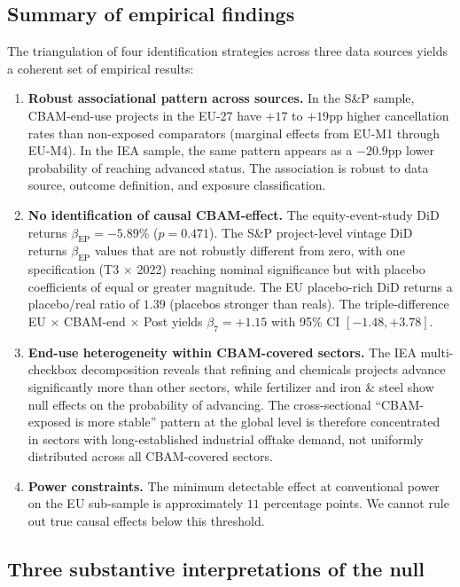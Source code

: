 \documentclass[11pt,a4paper]{article}
\newcommand{\bep}{\beta_{\mathrm{EP}}}
\begin{document}
\subsection{Summary of empirical findings}

The triangulation of four identification strategies across three data sources yields a coherent set of empirical results:

\begin{enumerate}
\item \textbf{Robust associational pattern across sources.} In the S\&P sample, CBAM-end-use projects in the EU-27 have $+17$ to $+19$pp higher cancellation rates than non-exposed comparators (marginal effects from EU-M1 through EU-M4). In the IEA sample, the same pattern appears as a $-20.9$pp lower probability of reaching advanced status. The association is robust to data source, outcome definition, and exposure classification.

\item \textbf{No identification of causal CBAM-effect.} The equity-event-study DiD returns $\bep = -5.89\%$ ($p = 0.471$). The S\&P project-level vintage DiD returns $\bep$ values that are not robustly different from zero, with one specification (T3 $\times$ 2022) reaching nominal significance but with placebo coefficients of equal or greater magnitude. The EU placebo-rich DiD returns a placebo/real ratio of $1.39$ (placebos stronger than reals). The triple-difference EU $\times$ CBAM-end $\times$ Post yields $\beta_7 = +1.15$ with 95\% CI $[-1.48, +3.78]$.

\item \textbf{End-use heterogeneity within CBAM-covered sectors.} The IEA multi-checkbox decomposition reveals that refining and chemicals projects advance significantly more than other sectors, while fertilizer and iron \& steel show null effects on the probability of advancing. The cross-sectional ``CBAM-exposed is more stable'' pattern at the global level is therefore concentrated in sectors with long-established industrial offtake demand, not uniformly distributed across all CBAM-covered sectors.

\item \textbf{Power constraints.} The minimum detectable effect at conventional power on the EU sub-sample is approximately $11$ percentage points. We cannot rule out true causal effects below this threshold.
\end{enumerate}

\subsection{Three substantive interpretations of the null}
\end{document}
